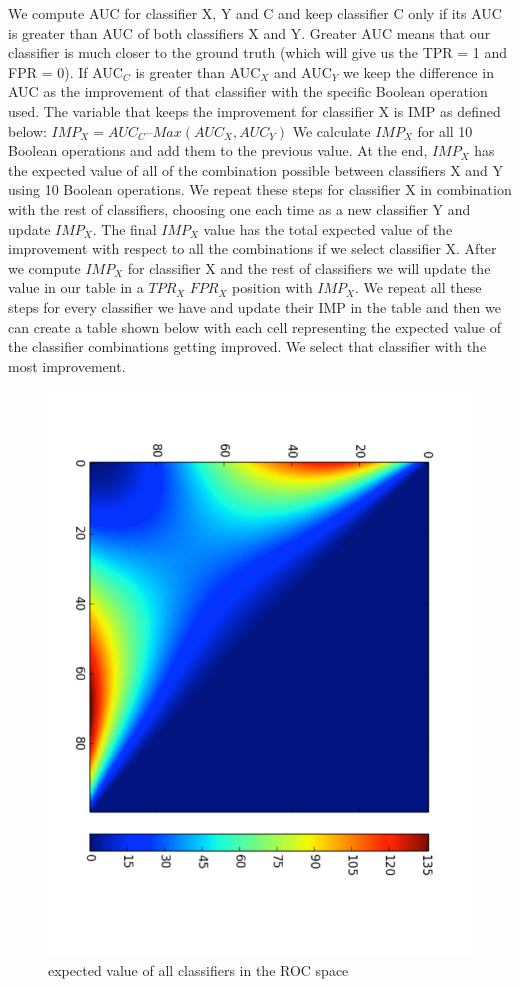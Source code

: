 We compute AUC for classifier X, Y and C and keep classifier C only if its AUC is greater than AUC of both classifiers X and Y. Greater AUC means that our classifier is much closer to the ground truth (which will give us the TPR = 1 and FPR = 0).
If AUC$_C$ is greater than AUC$_X$ and AUC$_Y$ we keep the difference in AUC as the improvement of that classifier with the specific Boolean operation used. The variable that keeps the improvement for classifier X is IMP as defined below:
$IMP_X  = AUC_C – Max (AUC_X, AUC_Y)$
We calculate $IMP_X$ for all 10 Boolean operations and add them to the previous value. At the end, $IMP_X$ has the expected value of all of the combination possible between classifiers X and Y using 10 Boolean operations. We repeat these steps for classifier X in combination with the rest of classifiers, choosing one each time as a new classifier Y and update $IMP_X$. The final $IMP_X$ value has the total expected value of the improvement with respect to all the combinations if we select classifier X. After we compute $IMP_X$ for classifier X and the rest of classifiers we will update the value in our table in a $TPR_X$ $FPR_X$ position with $IMP_X$. We repeat all these steps for every classifier we have and update their IMP in the table and then we can create a table shown below with each cell representing the expected value of the classifier combinations getting improved. We select that classifier with the most improvement.

\begin{figure}[H]
\centering
\includegraphics[scale=1]{figs/expected_value}
\caption{expected value of all classifiers in the ROC space}
\label{fig::expected_value}
\end{figure}

